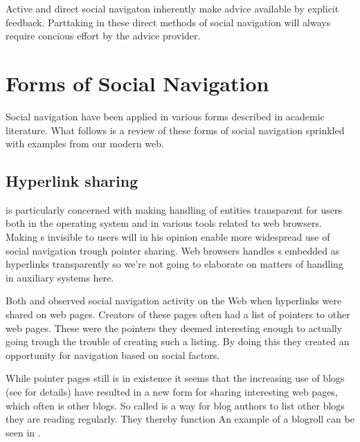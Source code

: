 Active and direct social navigaton inherently make advice available by
explicit feedback. Parttaking in these direct methods of social navigation
will always require concious effort by the advice provider.

\section{Forms of Social Navigation}

Social navigation have been applied in various forms described in
academic literature. What follows is a review of these forms of social
navigation sprinkled with examples from our modern web.

\subsection{Hyperlink sharing}

\citet{dieberger97} is particularly concerned with making handling of
%
entities transparent for users both in the operating system and in various
tools related to web browsers. Making s invisible to users will in
his opinion enable more widespread use of social navigation trough pointer
sharing. Web browsers handles s embedded as hyperlinks transparently
so we're not going to elaborate on matters of  handling in
auxiliary systems here.


Both \cite{dourish94} and \cite{dieberger97} observed social navigation
activity on the Web when hyperlinks were shared on web pages.
Creators of these pages often had a list of pointers to other web pages.
These were the pointers they deemed interesting enough to actually going
trough the trouble of creating such a listing. By doing this they created
an opportunity for navigation based on social factors.

While pointer pages still is in existence it seems that the increasing
use of blogs (see  for details)
have resulted in a new form for sharing interesting web pages,
which often is other blogs. So called  is a way for blog
authors to list other blogs they are reading regularly. They thereby function
An example of a blogroll can be seen in .

